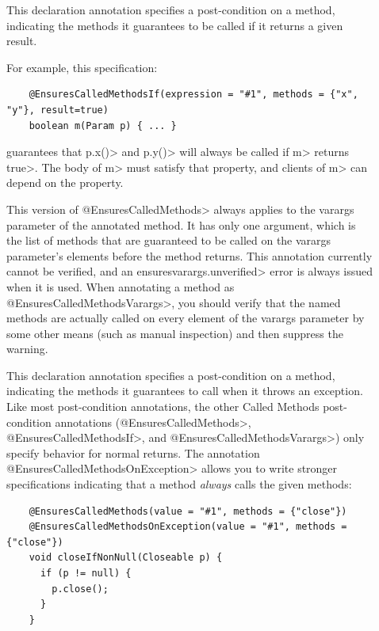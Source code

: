 \begin{description}
\item[]
  This declaration annotation specifies a post-condition on a method, indicating the methods it
  guarantees to be called if it returns a given result.

  For example, this specification:

  \begin{Verbatim}
    @EnsuresCalledMethodsIf(expression = "#1", methods = {"x", "y"}, result=true)
    boolean m(Param p) { ... }
  \end{Verbatim}

  guarantees that \<p.x()> and \<p.y()> will always be called if \<m> returns \<true>.
  The body of \<m> must satisfy that property, and clients of \<m> can depend on the property.

\item[]
  This version of \<@EnsuresCalledMethods> always applies to the varargs parameter of the
  annotated method. It has only one argument, which is the list of methods that are guaranteed
  to be called on the varargs parameter's elements before the method returns. This annotation
  currently cannot be verified, and an \<ensuresvarargs.unverified> error is always issued
  when it is used. When annotating a method as \<@EnsuresCalledMethodsVarargs>, you should verify
  that the named methods are actually called on every element of the varargs parameter by some
  other means (such as manual inspection) and then suppress the warning.

\item[]
  This declaration annotation specifies a post-condition on a method, indicating the methods it
  guarantees to call when it throws an exception.  Like most post-condition annotations, the
  other Called Methods post-condition annotations (\<@EnsuresCalledMethods>,
  \<@EnsuresCalledMethodsIf>, and \<@EnsuresCalledMethodsVarargs>) only specify behavior for
  normal returns.  The annotation \<@EnsuresCalledMethodsOnException> allows you to write
  stronger specifications indicating that a method \emph{always} calls the given methods:

  \begin{Verbatim}
    @EnsuresCalledMethods(value = "#1", methods = {"close"})
    @EnsuresCalledMethodsOnException(value = "#1", methods = {"close"})
    void closeIfNonNull(Closeable p) {
      if (p != null) {
        p.close();
      }
    }
  \end{Verbatim}


\end{description}
